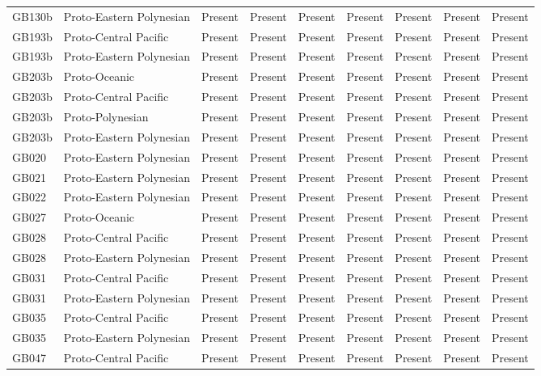 \begin{longtable}{p{1.5cm}p{2.5cm}p{2.5cm}p{2.5cm}p{2.5cm}p{2.5cm}p{2.5cm}p{2.5cm}p{2.5cm}}
  GB130b & Proto-Eastern Polynesian & Present & Present & Present & Present & Present & Present & Present \\ 
  GB193b & Proto-Central Pacific & Present & Present & Present & Present & Present & Present & Present \\ 
  GB193b & Proto-Eastern Polynesian & Present & Present & Present & Present & Present & Present & Present \\ 
  GB203b & Proto-Oceanic & Present & Present & Present & Present & Present & Present & Present \\ 
  GB203b & Proto-Central Pacific & Present & Present & Present & Present & Present & Present & Present \\ 
  GB203b & Proto-Polynesian & Present & Present & Present & Present & Present & Present & Present \\ 
  GB203b & Proto-Eastern Polynesian & Present & Present & Present & Present & Present & Present & Present \\ 
  GB020 & Proto-Eastern Polynesian & Present & Present & Present & Present & Present & Present & Present \\ 
  GB021 & Proto-Eastern Polynesian & Present & Present & Present & Present & Present & Present & Present \\ 
  GB022 & Proto-Eastern Polynesian & Present & Present & Present & Present & Present & Present & Present \\ 
  GB027 & Proto-Oceanic & Present & Present & Present & Present & Present & Present & Present \\ 
  GB028 & Proto-Central Pacific & Present & Present & Present & Present & Present & Present & Present \\ 
  GB028 & Proto-Eastern Polynesian & Present & Present & Present & Present & Present & Present & Present \\ 
  GB031 & Proto-Central Pacific & Present & Present & Present & Present & Present & Present & Present \\ 
  GB031 & Proto-Eastern Polynesian & Present & Present & Present & Present & Present & Present & Present \\ 
  GB035 & Proto-Central Pacific & Present & Present & Present & Present & Present & Present & Present \\ 
  GB035 & Proto-Eastern Polynesian & Present & Present & Present & Present & Present & Present & Present \\ 
  GB047 & Proto-Central Pacific & Present & Present & Present & Present & Present & Present & Present \\ 

\end{longtable}
